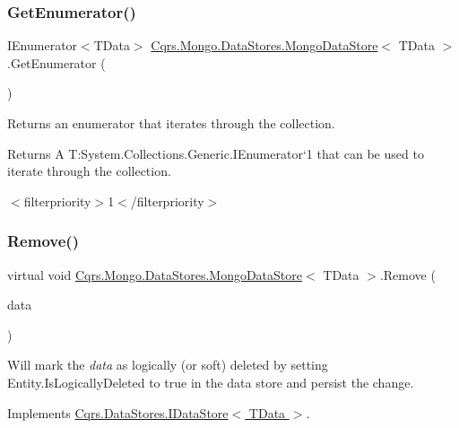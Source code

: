 \subsubsection{\texorpdfstring{Get\+Enumerator()}{GetEnumerator()}}
{\footnotesize\ttfamily I\+Enumerator$<$T\+Data$>$ \hyperlink{classCqrs_1_1Mongo_1_1DataStores_1_1MongoDataStore}{Cqrs.\+Mongo.\+Data\+Stores.\+Mongo\+Data\+Store}$<$ T\+Data $>$.Get\+Enumerator (\begin{DoxyParamCaption}{ }\end{DoxyParamCaption})}



Returns an enumerator that iterates through the collection. 

\begin{DoxyReturn}{Returns}
A T\+:\+System.\+Collections.\+Generic.\+I\+Enumerator`1 that can be used to iterate through the collection. 
\end{DoxyReturn}
$<$filterpriority$>$1$<$/filterpriority$>$ \mbox{\label{classCqrs_1_1Mongo_1_1DataStores_1_1MongoDataStore_a64003d01de3ac6ffd0e41bb7f572bf96_a64003d01de3ac6ffd0e41bb7f572bf96}} 
\subsubsection{\texorpdfstring{Remove()}{Remove()}}
{\footnotesize\ttfamily virtual void \hyperlink{classCqrs_1_1Mongo_1_1DataStores_1_1MongoDataStore}{Cqrs.\+Mongo.\+Data\+Stores.\+Mongo\+Data\+Store}$<$ T\+Data $>$.Remove (\begin{DoxyParamCaption}\item[{T\+Data}]{data }\end{DoxyParamCaption})\hspace{0.3cm}{\ttfamily [virtual]}}



Will mark the {\itshape data}  as logically (or soft) deleted by setting Entity.\+Is\+Logically\+Deleted to true in the data store and persist the change. 



Implements \hyperlink{interfaceCqrs_1_1DataStores_1_1IDataStore_a7ef540796bbe4257296841590bc23478_a7ef540796bbe4257296841590bc23478}{Cqrs.\+Data\+Stores.\+I\+Data\+Store$<$ T\+Data $>$}.

